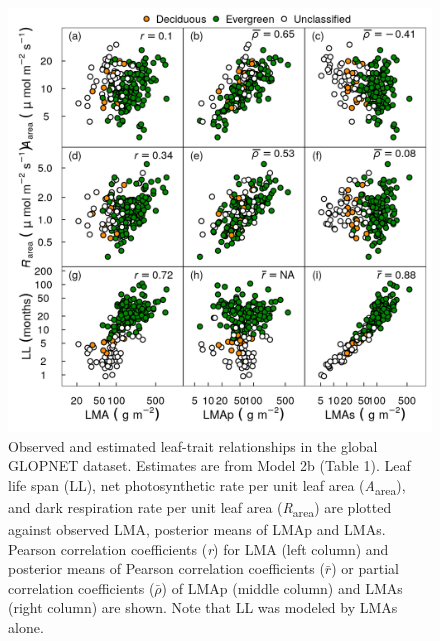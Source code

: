 \documentclass[
  12pt,
  a4paper,
,tablecaptionabove
]{scrartcl}
\begin{document}
\begin{figure}

{\centering \includegraphics{../figs/gl_point.png}

}

\caption{\label{fig-GLplt}Observed and estimated leaf-trait
relationships in the global GLOPNET dataset. Estimates are from Model 2b
(Table 1). Leaf life span (LL), net photosynthetic rate per unit leaf
area (\emph{A}\textsubscript{area}), and dark respiration rate per unit
leaf area (\emph{R}\textsubscript{area}) are plotted against observed
LMA, posterior means of LMAp and LMAs. Pearson correlation coefficients
(\emph{r}) for LMA (left column) and posterior means of Pearson
correlation coefficients (\(\bar{r}\)) or partial correlation
coefficients (\(\bar{\rho}\)) of LMAp (middle column) and LMAs (right
column) are shown. Note that LL was modeled by LMAs alone.}

\end{figure}

\newpage
\end{document}
